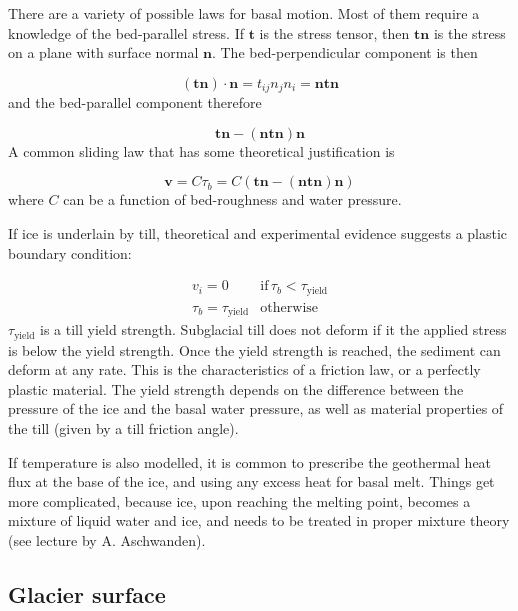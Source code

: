 \documentclass[12pt, openany]{memoir}
\begin{document}
There are a variety of possible laws for basal motion. Most of them
require a knowledge of the bed-parallel stress. If $\mathbf{t}$ is the
stress tensor, then $\mathbf{t} \mathbf{n}$ is the stress on a plane
with surface normal $\mathbf{n}$. The bed-perpendicular component is
then 

\begin{equation}
(\mathbf{t} \mathbf{n}) \cdot \mathbf{n} = t_{ij}n_jn_i =  \mathbf{n}
  \mathbf{t} \mathbf{n}
\end{equation}
and the bed-parallel component therefore

\begin{equation}
\mathbf{t} \mathbf{n} - (\mathbf{n} \mathbf{t} \mathbf{n}) \mathbf{n}
\end{equation}
A common sliding law that has some theoretical justification is

\begin{equation}
\mathbf{v} = C \tau_b = C ( \mathbf{t} \mathbf{n} - (\mathbf{n}
  \mathbf{t} \mathbf{n}) \mathbf{n} )
\end{equation}
where $C$ can be a function of bed-roughness and water pressure.

If ice is underlain by till, theoretical and experimental evidence
suggests a plastic boundary condition:

\begin{eqnarray}
v_i = 0 &\mathrm{if} \, \tau_b < \tau_\mathrm{yield} \\
\tau_b = \tau_\mathrm{yield}  &\mathrm{otherwise}
\end{eqnarray}
$\tau_\mathrm{yield}$ is a till yield strength. Subglacial till does
not deform if it the applied stress is below the yield strength. Once
the yield strength is reached, the sediment can deform at any
rate. This is the characteristics of a friction law, or a perfectly
plastic material. The yield strength depends on the difference between
the pressure of the ice and the basal water pressure, as well as
material properties of the till (given by a till friction angle).

If temperature is also modelled, it is common to prescribe the
geothermal heat flux at the base of the ice, and using any excess heat
for basal melt. Things get more complicated, because ice, upon
reaching the melting point, becomes a mixture of liquid water and ice,
and needs to be treated in proper mixture theory (see lecture by
A. Aschwanden). 

\subsection{Glacier surface}
\end{document}

